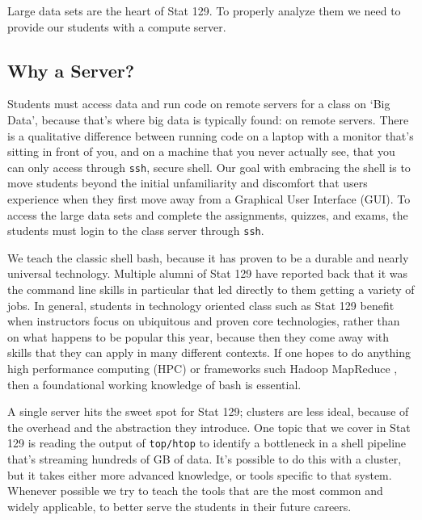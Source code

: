 \documentclass[12pt]{article}
\begin{document}
Large data sets are the heart of Stat 129.
To properly analyze them we need to provide our students with a compute server.


\subsection{Why a Server?}
\label{sec:server}

Students must access data and run code on remote servers for a class on `Big Data', because that's where big data is typically found: on remote servers.
There is a qualitative difference between running code on a laptop with a monitor that's sitting in front of you, and on a machine that you never actually see, that you can only access through \texttt{ssh}, secure shell.
Our goal with embracing the shell is to move students beyond the initial unfamiliarity and discomfort that users experience when they first move away from a Graphical User Interface (GUI).
To access the large data sets and complete the assignments, quizzes, and exams, the students must login to the class server through \texttt{ssh}.

We teach the classic shell bash, because it has proven to be a durable and nearly universal technology.
Multiple alumni of Stat 129 have reported back that it was the command line skills in particular that led directly to them getting a variety of jobs.
In general, students in technology oriented class such as Stat 129 benefit when instructors focus on ubiquitous and proven core technologies, rather than on what happens to be popular this year, because then they come away with skills that they can apply in many different contexts.
If one hopes to do anything high performance computing (HPC) or frameworks such Hadoop MapReduce \cite{white2012hadoop}, then a foundational working knowledge of bash is essential.

A single server hits the sweet spot for Stat 129; clusters are less ideal, because of the overhead and the abstraction they introduce.
One topic that we cover in Stat 129 is reading the output of \texttt{top/htop} to identify a bottleneck in a shell pipeline that's streaming hundreds of GB of data.
It's possible to do this with a cluster, but it takes either more advanced knowledge, or tools specific to that system.
Whenever possible we try to teach the tools that are the most common and widely applicable, to better serve the students in their future careers.
\end{document}
